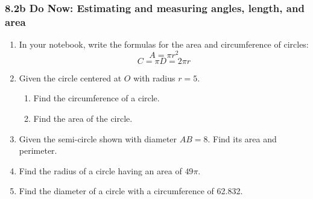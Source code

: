 \documentclass[12pt, twoside]{article}
\begin{document}
\subsubsection*{8.2b Do Now: Estimating and measuring angles, length, and area}
 \begin{enumerate}

  \item In your notebook, write the formulas for the area and circumference of circles:
\[A=\pi r^2\]
\[C=\pi D = 2\pi r\]

  \item Given the circle centered at $O$ with radius $r=5$.
  \begin{multicols}{2}
    \begin{enumerate}
      \item Find the circumference of a circle. %
      \item Find the area of the circle.\vspace{3cm}
    \end{enumerate}
  \end{multicols}

  \item Given the semi-circle shown with diameter $AB=8$. Find its area and perimeter.
    \begin{flushright}
  \end{flushright} \vspace{1cm}

  \item Find the radius of a circle having an area of $49 \pi$. \vspace{2cm}
  \item Find the diameter of a circle with a circumference of 62.832.


\end{enumerate}
\end{document}
